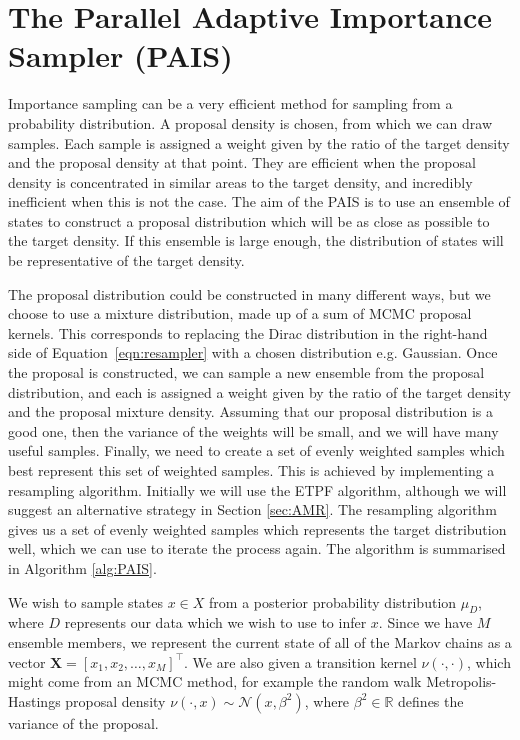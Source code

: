 \documentclass[final]{siamltex}
\newcommand{\X}{{\mathbf X}}
\begin{document}
\section{The Parallel Adaptive Importance Sampler \allowbreak (PAIS)}\label{Sec:PAIS}

Importance sampling can be a very efficient method for sampling from a
probability distribution. A proposal density is chosen, from which we
can draw samples. Each sample is assigned a weight given by the
ratio of the target density and the proposal density at that
point. They are efficient when the proposal density is concentrated in
similar areas to the target density, and incredibly inefficient when
this is not the case. The aim of the PAIS is to use an ensemble of states to construct a proposal
distribution which will be as close as possible to the target density. If this
ensemble is large enough, the distribution of states will be representative
of the target density.

The proposal distribution could be constructed in many different ways,
but we choose to use a mixture distribution, made up of a sum of MCMC
proposal kernels. This corresponds to replacing the Dirac distribution
in the right-hand side of Equation~\ref{eqn:resampler} with a chosen
distribution e.g. Gaussian. Once the proposal is constructed, we can
sample a new ensemble from the proposal distribution, and each is
assigned a weight given by the ratio of the target density and the
proposal mixture density. Assuming that our proposal distribution is a
good one, then the variance of the weights will be small, and we will
have many useful samples. Finally, we need to create a set of evenly
weighted samples which best represent this set of weighted samples.
This is achieved by implementing a resampling algorithm. Initially we
will use the ETPF algorithm\cite{reich2013nonparametric}, although we
will suggest an alternative strategy in Section \ref{sec:AMR}. The
resampling algorithm gives us a set of evenly weighted samples which
represents the target distribution well, which we can use to iterate
the process again. The algorithm is summarised in Algorithm
\ref{alg:PAIS}.

We wish to sample states $x \in X$ from a posterior
probability distribution $\mu_D$, where $D$ represents our data which
we wish to use to infer $x$. Since we have $M$ ensemble members, we
represent the current state of all of the Markov chains as a vector
$\X = [x_1,x_2,\ldots,x_M]^\top$. We are also given a transition kernel
$\nu(\cdot,\cdot)$, which might come from an MCMC method, for example
the random walk Metropolis-Hastings proposal density $\nu(\cdot,x) \sim
\mathcal{N}(x,\beta^2)$, where $\beta^2\in \mathbb{R}$ defines the
variance of the proposal.
\end{document}

